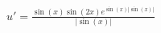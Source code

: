 $ u' = \frac{\sin{(x)} \sin{(2x)} e^{\sin{(x)} \lvert \sin{(x)} \rvert}}{\lvert\sin{(x)}\rvert}$

\begin{solution}
  \ \\
\end{solution}